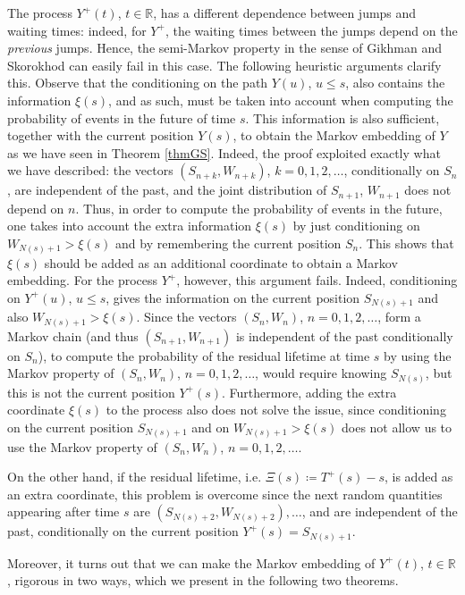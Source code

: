 \documentclass[reqno]{amsart}
\theoremstyle{remark}
\numberwithin{equation}{section} %
\newcommand{\RR}{\mathbb{R}}
\newcommand{\1}{\mathds{1}}
\begin{document}
	The process $Y^+(t)$, $t\in\RR$, has a different dependence between jumps and waiting times: indeed, for $Y^+$, the waiting times between the jumps depend on the \emph{previous} jumps. Hence, the semi-Markov property in the sense of Gikhman and Skorokhod can easily fail in this case. The following heuristic arguments clarify this. Observe that the conditioning on the path $Y(u)$, $u \leq s$, also contains the information $\xi(s)$, and as such, must be taken into account when computing the probability of events in the future of time $s$. This information is also sufficient, together with the current position $Y(s)$, to obtain the Markov embedding of $Y$ as we have seen in Theorem \ref{thmGS}. Indeed, the proof exploited exactly what we have described: the vectors $(S_{n+k}, W_{n+k})$, $k=0,1,2,\dots$, conditionally on $S_{n}$, are independent of the past, and the joint distribution of $S_{n+1}$, $W_{n+1}$ does not depend on $n$. Thus, in order to compute the probability of events in the future, one takes into account the extra information $\xi(s)$ by just conditioning on $W_{N(s)+1}>\xi(s)$ and by remembering the current position $S_n$. This shows that $\xi(s)$ should be added as an additional coordinate to obtain a Markov embedding. For the process $Y^+$, however, this argument fails. Indeed, conditioning on $Y^+(u)$, $u \leq s$, gives the information on the current position $S_{N(s)+1}$ and also $W_{N(s)+1}>\xi(s)$. Since the vectors $(S_n, W_n)$, $n =0,1,2,\dots$, form a Markov chain (and thus $(S_{n+1}, W_{n+1})$ is independent of the past conditionally on $S_n$), to compute the probability of the residual lifetime at time $s$ by using the Markov property of $(S_n,W_n)$, $n=0,1,2,\dots$, would require knowing $S_{N(s)}$, but this is not the current position $Y^+(s)$. Furthermore, adding the extra coordinate $\xi(s)$ to the process also does not solve the issue, since conditioning on the current position $S_{N(s)+1}$ and on $W_{N(s)+1}>\xi(s)$ does not allow us to use the Markov property of $(S_n, W_n)$, $n=0,1,2,\dots$.
	
	On the other hand, if the residual lifetime, i.e. $\Xi(s)\coloneqq T^+(s)-s$, is added as an extra coordinate, this problem is overcome since the next random quantities appearing after time $s$ are $(S_{N(s)+2}, W_{N(s)+2}), \dots$, and are independent of the past, conditionally on the current position $Y^+(s)=S_{N(s)+1}$.
	
	Moreover, it turns out that we can make the Markov embedding of $Y^+(t)$, $t\in\RR$, rigorous in two ways, which we present in the following two theorems.
	
\end{document}
